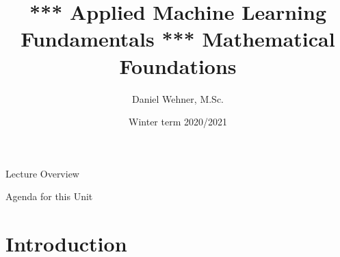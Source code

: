 


\title[Mathematical Foundations]{*** Applied Machine Learning Fundamentals *** Mathematical Foundations}
\author{Daniel Wehner, M.Sc.}
\date{Winter term 2020/2021}




\maketitlepage


\begin{frame}{Lecture Overview}{}
\end{frame}


\begin{frame}{Agenda for this Unit}
	\begin{multicols}{2}
		\tableofcontents
	\end{multicols}
\end{frame}


\section{Introduction}

